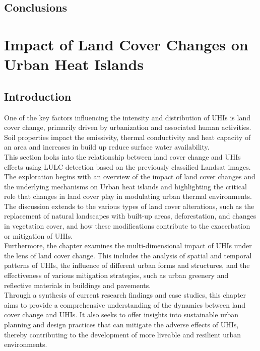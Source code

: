 \documentclass[12pt,a4paper, english]{article}
\begin{document}
    \subsection{Conclusions}	

%    
\newpage
\section{Impact of Land Cover Changes on Urban Heat Islands}\label{sec:LULC}
    \subsection{Introduction}
      One of the key factors influencing the intensity and distribution of \glspl{UHI} is land cover change, primarily driven by urbanization and associated human activities.
      Soil properties impact the emissivity, thermal conductivity and heat capacity of an area and increases in build up reduce surface water availability. 
      \\    
      This section looks into the relationship between land cover change and \glspl{UHI} effects using \gls{LULC} detection based on the previously classified Landsat images.
      The exploration begins with an overview of the impact of land cover changes and the underlying mechanisms on Urban heat islands and highlighting the critical role that changes in land cover play in modulating urban thermal environments.
      The discussion extends to the various types of land cover alterations, such as the replacement of natural landscapes with built-up areas, deforestation, and changes in vegetation cover, and how these modifications contribute to the exacerbation or mitigation of \glspl{UHI}.
      \\
      Furthermore, the chapter examines the multi-dimensional impact of \glspl{UHI} under the lens of land cover change.
      This includes the analysis of spatial and temporal patterns of \glspl{UHI}, the influence of different urban forms and structures, and the effectiveness of various mitigation strategies, such as urban greenery and reflective materials in buildings and pavements.
      \\
      Through a synthesis of current research findings and case studies, this chapter aims to provide a comprehensive understanding of the dynamics between land cover change and \glspl{UHI}.
      It also seeks to offer insights into sustainable urban planning and design practices that can mitigate the adverse effects of \glspl{UHI}, thereby contributing to the development of more liveable and resilient urban environments.
%
\end{document}

